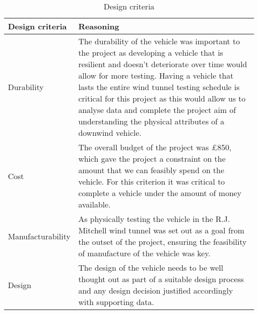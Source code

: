 \begin{table}[H]
\centering
\caption{Design criteria}
\label{tab:desigCrit}
\begin{tabular}{|
>{\columncolor[HTML]{\CellColor}}l |p{14cm}|}
\hline
Design criteria   & \cellcolor[HTML]{\CellColor}Reasoning                                                                                                                                                                                                                                                                                                                                                                                      \\ \hline
Durability        & The durability of the vehicle was important to the project as developing a vehicle that is resilient and doesn’t deteriorate over time would allow for more testing. Having a vehicle that lasts the entire wind tunnel testing schedule is critical for this project as this would allow us to analyse data and complete the project aim of understanding the physical attributes of a downwind vehicle. \\ \hline
Cost              & The overall budget of the project was £850, which gave the project a constraint on the amount that we can feasibly spend on the vehicle. For this criterion it was critical to complete a vehicle under the amount of money available.\\ \hline
Manufacturability & As physically testing the vehicle in the R.J. Mitchell wind tunnel was set out as a goal from the outset of the project, ensuring the feasibility of manufacture of the vehicle was key.                                                                                                                                                                \\ \hline
Design            & The design of the vehicle needs to be well thought out as part of a suitable design process and any design decision justified accordingly with supporting data.                                                                                                                                                                                                                                                                                                                        \\ \hline

\end{tabular}
\end{table}
